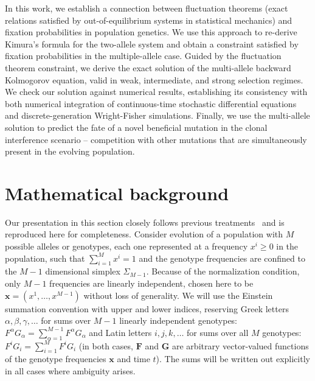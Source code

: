 \documentclass[9pt,twocolumn,twoside]{gsajnl}
\begin{document}
In this work, we establish a connection between fluctuation theorems (exact relations satisfied by out-of-equilibrium systems in statistical mechanics) and fixation probabilities in population genetics.
We use this approach to re-derive Kimura's formula for the two-allele system and obtain a constraint satisfied by fixation probabilities in the multiple-allele case.
Guided by the fluctuation theorem constraint, we derive the exact solution of the multi-allele backward Kolmogorov equation, valid in weak, intermediate, and strong selection regimes.
We check our solution against numerical results, establishing its consistency with both numerical integration of continuous-time stochastic differential equations and discrete-generation Wright-Fisher simulations.
Finally, we use the multi-allele solution to predict the fate of a novel beneficial mutation in the clonal interference scenario -- competition with other mutations that are simultaneously present in the evolving population.



\section{Mathematical background}

Our presentation in this section closely follows previous treatments~\citep{Chernyak2006,Mustonen2010} and is reproduced here for completeness.
Consider evolution of a population with $M$ possible alleles or genotypes, each one represented at a frequency $x^i \ge 0$ in the population, such that $\sum_{i=1}^M x^i = 1$ and the genotype frequencies are confined to the $M-1$ dimensional simplex $\Sigma_{M-1}$. Because of the normalization condition, only $M-1$ frequencies are linearly independent, chosen here to be $\mathbf{x} = (x^1, \dots, x^{M-1})$ without loss of generality.
We will use the Einstein summation convention with upper and lower indices, reserving Greek letters $\alpha, \beta, \gamma, \dots$ for sums over $M-1$ linearly independent genotypes:
$F^\alpha G_\alpha = \sum_{\alpha=1}^{M-1} F^\alpha G_\alpha$ and Latin letters
$i, j, k, \dots$ for sums over all $M$ genotypes: $F^i G_i = \sum_{i=1}^M F^i G_i$ (in both cases, $\mathbf{F}$ and $\mathbf{G}$ are arbitrary vector-valued functions of the genotype frequencies $\mathbf{x}$ and time $t$).
The sums will be written out explicitly in all cases where ambiguity arises.
\end{document}
